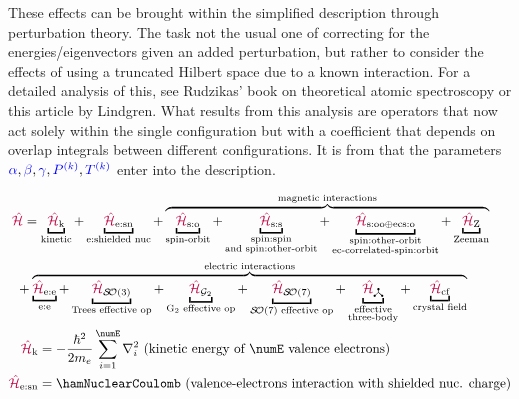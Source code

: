\documentclass[11pt, twoside,openright]{article}
\begin{document}
These effects can be brought within the simplified description through perturbation theory. The task not the usual one of correcting for the energies/eigenvectors given an added perturbation, but rather to consider the effects of using a truncated Hilbert space due to a known interaction. For a detailed analysis of this, see Rudzikas' book \cite{rudzikas_theoretical_2007} on theoretical atomic spectroscopy or this article \cite{lindgren_rayleigh-schrodinger_1974} by Lindgren. What results from this analysis are operators that now act solely within the single configuration but with a coefficient that depends on overlap integrals between different configurations. It is from \confint that the parameters $\textcolor{blue}{{\alpha}}, \textcolor{blue}{{\beta}}, \textcolor{blue}{{\gamma}}, \textcolor{blue}{P^{(k)}}, \textcolor{blue}{T^{(k)}}$ enter into the description.

\begin{mdframed}
\begin{align} 
	& \!\!\!\!\!\!\!\!\!\!\!\! \ham = \underbracket{\hamKineticSymbol}_{\text{kinetic}}
		 + \underbracket{\hamNuclearCoulombSymbol}_{\text{e:shielded nuc}}
		 + \overbrace{\underbracket{\hamSpinOrbitSymbol}_{\text{spin-orbit}}
		 + \underbracket{\hamSpinSpinSymbol}_{
		 			\substack{
		 				\text{spin:spin} \\ 
		 				\text{and spin:other-orbit}
		 				}
		 			} 
         + \underbracket{\hamSOOplusECSOSymbol}_{
            \substack{
                \text{spin:other-orbit} \\ 
                \text{ec-correlated-spin:orbit}
                }
         }
         + \underbracket{\hamZeemanSymbol}_{\text{Zeeman}}}^{\text{magnetic interactions}}  \nonumber \\
         & \!\! \!\! \!\! \!\! \!\!+ \overbrace{\underbracket{\hamCoulombEESymbol}_{\text{e:e}} 
         + \underbracket{\hamTreesSymbol}_\text{Trees effective op} 
		 + \underbracket{\hamGTwoSymbol}_\text{G${}_2$ effective op} 
		 + \underbracket{\hamSOSevenSymbol}_\text{$\SO{7}$ effective op} 
		 + \underbracket{\ham_{\trispoke}}_{\substack{
            \text{effective} \\
            \text{three-body}}}
         + \underbracket{\hamCrystalFieldSymbol}_{\text{crystal field}}}^{\text{electric interactions}} \label{eqn:hamiltonian} \\
	\hamKineticSymbol &= -\frac{\hbar^2}{2m_e}\sum_{i=1}^\numE \nabla_i^2 \text{ (kinetic energy of $\numE$ valence electrons)}\\
	\hamNuclearCoulombSymbol &= \hamNuclearCoulomb \text{ (valence-electrons interaction with shielded nuc. charge)} \\

\end{align}
\end{mdframed}
\end{document}

